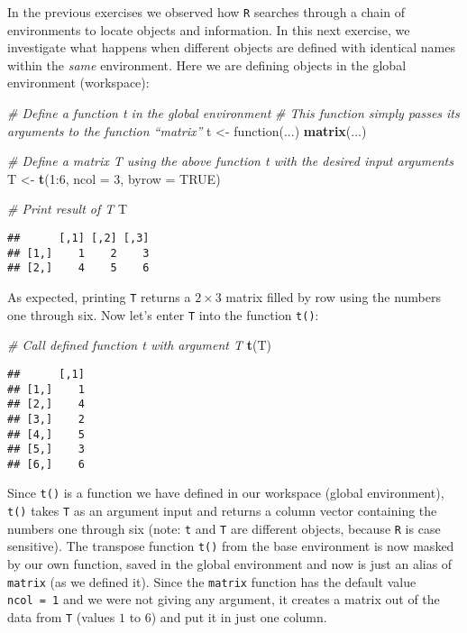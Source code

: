 \documentclass[11,]{article}
\newenvironment{Shaded}{\begin{snugshade}}{\end{snugshade}}
\newcommand{\KeywordTok}[1]{\textcolor[rgb]{0.13,0.29,0.53}{\textbf{{#1}}}}
\newcommand{\DataTypeTok}[1]{\textcolor[rgb]{0.13,0.29,0.53}{{#1}}}
\newcommand{\DecValTok}[1]{\textcolor[rgb]{0.00,0.00,0.81}{{#1}}}
\newcommand{\StringTok}[1]{\textcolor[rgb]{0.31,0.60,0.02}{{#1}}}
\newcommand{\CommentTok}[1]{\textcolor[rgb]{0.56,0.35,0.01}{\textit{{#1}}}}
\newcommand{\OtherTok}[1]{\textcolor[rgb]{0.56,0.35,0.01}{{#1}}}
\newcommand{\NormalTok}[1]{{#1}}
\begin{document}
In the previous exercises we observed how \texttt{R} searches through a
chain of environments to locate objects and information. In this next
exercise, we investigate what happens when different objects are defined
with identical names within the \emph{same} environment. Here we are
defining objects in the global environment (workspace):

\begin{Shaded}
\begin{Highlighting}[]
\CommentTok{# Define a function t in the global environment}
\CommentTok{# This function simply passes its arguments to the function “matrix”}
\NormalTok{t <-}\StringTok{ }\NormalTok{function(...) }\KeywordTok{matrix}\NormalTok{(...)}

\CommentTok{# Define a matrix T using the above function t with the desired input arguments}
\NormalTok{T <-}\StringTok{ }\KeywordTok{t}\NormalTok{(}\DecValTok{1}\NormalTok{:}\DecValTok{6}\NormalTok{, }\DataTypeTok{ncol =} \DecValTok{3}\NormalTok{, }\DataTypeTok{byrow =} \OtherTok{TRUE}\NormalTok{)}

\CommentTok{# Print result of T}
\NormalTok{T}
\end{Highlighting}
\end{Shaded}

\begin{verbatim}
##      [,1] [,2] [,3]
## [1,]    1    2    3
## [2,]    4    5    6
\end{verbatim}

As expected, printing \texttt{T} returns a \(2 \times 3\) matrix filled
by row using the numbers one through six. Now let's enter \texttt{T}
into the function \texttt{t()}:

\begin{Shaded}
\begin{Highlighting}[]
\CommentTok{# Call defined function t with argument T}
\KeywordTok{t}\NormalTok{(T)}
\end{Highlighting}
\end{Shaded}

\begin{verbatim}
##      [,1]
## [1,]    1
## [2,]    4
## [3,]    2
## [4,]    5
## [5,]    3
## [6,]    6
\end{verbatim}

Since \texttt{t()} is a function we have defined in our workspace
(global environment), \texttt{t()} takes \texttt{T} as an argument input
and returns a column vector containing the numbers one through six
(note: \texttt{t} and \texttt{T} are different objects, because
\texttt{R} is case sensitive). The transpose function \texttt{t()} from
the base environment is now masked by our own function, saved in the
global environment and now is just an alias of \texttt{matrix} (as we
defined it). Since the \texttt{matrix} function has the default value
\texttt{ncol\ =\ 1} and we were not giving any argument, it creates a
matrix out of the data from \texttt{T} (values \(1\) to \(6\)) and put
it in just one column.
\end{document}
